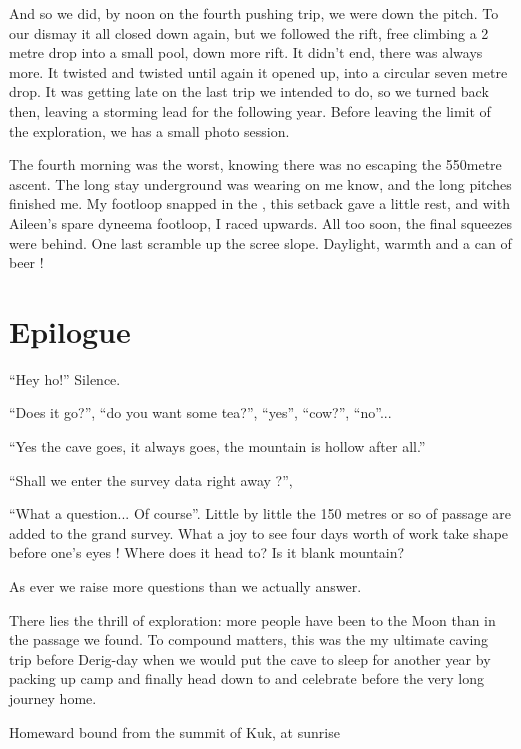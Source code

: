 And so we did, by noon on the fourth pushing trip, we were down the pitch. To our dismay it all closed down again, but we followed the rift, free climbing a 2 metre drop into a small pool, down more rift. It didn't end, there was always more. It twisted and twisted until again it opened up, into a circular seven metre drop. It was getting late on the last trip we intended to do, so we turned back then, leaving a storming lead for the following year. Before leaving the limit of the exploration, we has a small photo session.

The fourth morning was the worst, knowing there was no escaping the 550metre ascent. The long stay underground was wearing on me know, and the long pitches finished me. My footloop snapped in the , this setback gave a little rest, and with Aileen's spare dyneema footloop, I raced upwards. All too soon, the final squeezes were behind. One last scramble up the scree slope. Daylight, warmth and a can of beer !

\section{Epilogue}
``Hey ho!'' Silence. 

``Does it go?'', ``do you want some tea?'', ``yes'', ``cow?'', ``no''...

``Yes the cave goes, it always goes, the mountain is hollow after all.''

``Shall we enter the survey data right away ?'',

``What a question... Of course''. Little by little the 150 metres or so of passage are added to the grand survey. What a joy to see four days worth of work take shape before one's eyes ! Where does it head to? Is it blank mountain? 

As ever we raise more questions than we actually answer.

There lies the thrill of exploration: more people have been to the Moon than in the passage we found. To compound matters, this was the my ultimate caving trip before Derig-day when we would put the cave to sleep for another year by packing up camp  and finally head down to  and celebrate before the very long journey home. 


\begin{pagefigure}
\checkoddpage \ifoddpage \forcerectofloat \else \forceversofloat \fi
\centering
{}
\caption{Homeward bound from the summit of Kuk, at sunrise}
\label{the plateau}
\end{pagefigure}


